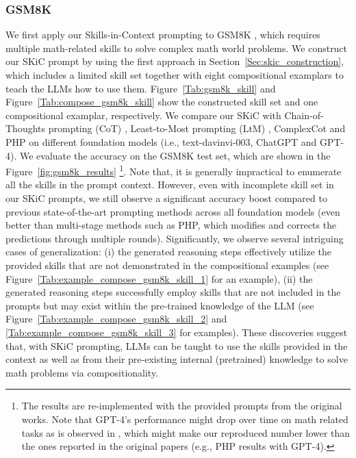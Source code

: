 \subsubsection{GSM8K}
We first apply our Skills-in-Context prompting to GSM8K \citep{cobbe2021training}, which requires multiple math-related skills to solve complex math world problems. We construct our SKiC prompt by using the first approach in Section~\ref{Sec:skic_construction},
which includes a limited skill set together with eight compositional examplars to teach the LLMs how to use them. Figure~\ref{Tab:gsm8k_skill} and Figure~\ref{Tab:compose_gsm8k_skill} show the constructed skill set and one compositional examplar, respectively. We compare our SKiC with Chain-of-Thoughts prompting (CoT) \citep{wei2022chain}, Least-to-Most prompting (LtM) \citep{zhou2022least}, ComplexCot \citep{fu2022complexity} and PHP \citep{zheng2023progressive} on different foundation models (i.e., text-davinvi-003, ChatGPT and GPT-4). We evaluate the accuracy on the GSM8K test set, which are shown in the Figure~\ref{fig:gsm8k_results} \footnote{The results are re-implemented with the provided prompts from the original works. Note that GPT-4's performance might drop over time on math related tasks as is observed in \citet{chen2023chatgpts}, which might make our reproduced number lower than the ones reported in the original papers (e.g., PHP results with GPT-4).}. Note that, it is generally impractical to enumerate all the skills in the prompt context. However, even with incomplete skill set in our SKiC prompts, we still observe a significant accuracy boost compared to previous state-of-the-art prompting methods across all foundation models (even better than multi-stage methods such as PHP, which modifies and corrects the predictions through multiple rounds). Significantly, we observe several intriguing cases of generalization: (i) the generated reasoning steps effectively utilize the provided skills that are not demonstrated in the compositional examples (see Figure~\ref{Tab:example_compose_gsm8k_skill_1} for an example), (ii) the generated reasoning steps successfully employ skills that are not included in the prompts but may exist within the pre-trained knowledge of the LLM (see Figure~\ref{Tab:example_compose_gsm8k_skill_2} and \ref{Tab:example_compose_gsm8k_skill_3} for examples). These discoveries suggest that, with SKiC prompting, LLMs can be taught to use the skills provided in the context as well as from their pre-existing internal (pretrained) knowledge to solve math problems via compositionality. 



